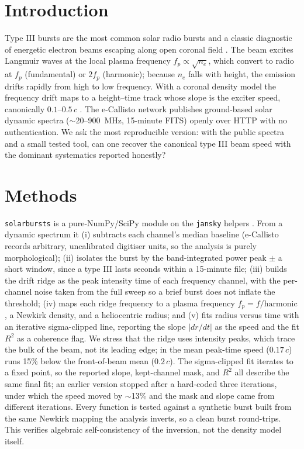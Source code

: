 \documentclass[twocolumn]{aastex631}
\newcommand{\code}[1]{\texttt{#1}}
\begin{document}
\section{Introduction}
Type III bursts are the most common solar radio bursts and a classic diagnostic of energetic electron
beams escaping along open coronal field \citep{reidratcliffe2014}. The beam excites Langmuir waves at the
local plasma frequency $f_p\propto\sqrt{n_e}$, which convert to radio at $f_p$ (fundamental) or $2f_p$
(harmonic); because $n_e$ falls with height, the emission drifts rapidly from high to low frequency. With
a coronal density model the frequency drift maps to a height--time track whose slope is the exciter
speed, canonically $0.1$--$0.5\,c$ \citep{reidratcliffe2014,reidkontar2018}. The e-Callisto network
\citep{benz2009} publishes ground-based solar dynamic spectra ($\sim$20--900~MHz, 15-minute FITS) openly
over HTTP with no authentication. We ask the most reproducible version: with the public spectra and a
small tested tool, can one recover the canonical type III beam speed with the dominant systematics
reported honestly?

\section{Methods}
\code{solarbursts} is a pure-NumPy/SciPy module on the \code{jansky} helpers \citep{jansky}. From a
dynamic spectrum it (i) subtracts each channel's median baseline (e-Callisto records arbitrary,
uncalibrated digitiser units, so the analysis is purely morphological); (ii) isolates the burst by the
band-integrated power peak $\pm$ a short window, since a type III lasts seconds within a 15-minute file;
(iii) builds the drift ridge as the peak intensity time of each frequency channel, with the
per-channel noise taken from the full sweep so a brief burst does not inflate the threshold; (iv) maps
each ridge frequency to a plasma frequency $f_p=f/\mathrm{harmonic}$, a Newkirk density, and a
heliocentric radius; and (v) fits radius versus time with an iterative sigma-clipped line, reporting the
slope $|dr/dt|$ as the speed and the fit $R^2$ as a coherence flag. We stress that the ridge uses
intensity peaks, which trace the bulk of the beam, not its leading edge; in \citet{reidkontar2018}
the mean peak-time speed ($0.17\,c$) runs 15\% below the front-of-beam mean ($0.2\,c$). The
sigma-clipped fit iterates to a fixed point, so the reported slope, kept-channel mask, and $R^2$
all describe the same final fit; an earlier version stopped after a hard-coded three iterations,
under which the speed moved by $\sim$13\% and the mask and slope came from different iterations.
Every function is tested against a synthetic burst built from the same Newkirk mapping the
analysis inverts, so a clean burst round-trips. This verifies algebraic self-consistency of the
inversion, not the density model itself.
\end{document}
